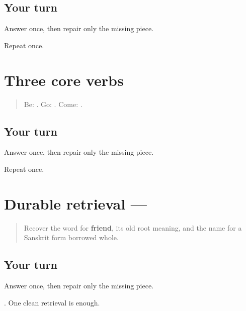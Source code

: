 \subsection*{Your turn}
Answer once, then repair only the missing piece.

\begin{tcolorbox}[breakable,colback=teal!4,colframe=teal!35!black,title={Before you move on}]
Repeat once.
\end{tcolorbox}
\section[\texorpdfstring{\mr{असणे} / \mr{जाणे} / \mr{येणे} (asne / jane / yene)}{असणे / जाणे / येणे (asne / jane / yene)}]{Three core verbs}

\label{lesson:MR-R14-core}



\begin{quote}
Be: \textbf{}. Go: \textbf{}. Come: \textbf{}.
\end{quote}

\subsection*{Your turn}
Answer once, then repair only the missing piece.

\begin{tcolorbox}[breakable,colback=teal!4,colframe=teal!35!black,title={Before you move on}]
Repeat once.
\end{tcolorbox}
\section[\texorpdfstring{\mr{मित्र} (mitra)}{मित्र (mitra)}]{Durable retrieval — }

\label{lesson:MR-R14-mitra-r3}



\begin{quote}
Recover the word for \textbf{friend}, its old root meaning, and the name for a Sanskrit form borrowed whole.
\end{quote}

\subsection*{Your turn}
Answer once, then repair only the missing piece.

\begin{tcolorbox}[breakable,colback=teal!4,colframe=teal!35!black,title={Before you move on}]
\textbf{}. One clean retrieval is enough.
\end{tcolorbox}
